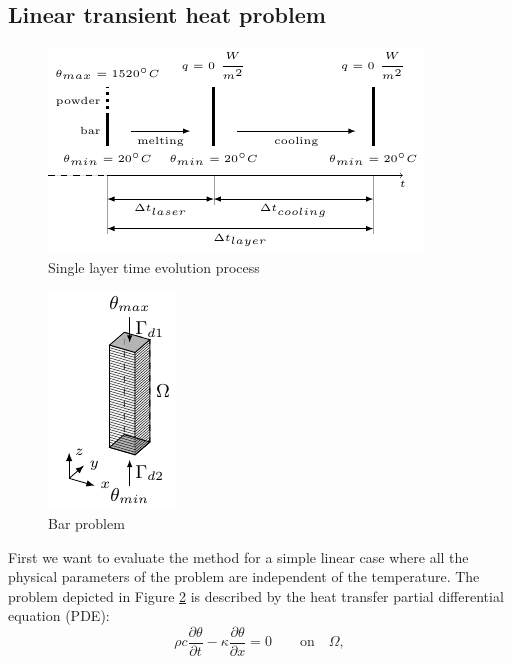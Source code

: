 \documentclass[3p]{article}
\begin{document}
\subsection*{Linear transient heat problem}
\begin{figure}[!h]
\centering
  \includegraphics[width=0.8\linewidth]{Pictures/OneDimensionalPhysicalModelProcess.pdf}
  \caption{Single layer time evolution process}
  \label{fig:1DProcessLayer}
  
\end{figure}
\begin{figure}[!h]
\centering
  \includegraphics[width=0.4\linewidth]{Pictures/AMBar1DInProgress_mod.pdf}
  \caption{Bar problem}
  \label{fig:1DProblem}
  
\end{figure}
First we want to evaluate the method for a simple linear case where all the physical parameters of the problem are independent of the temperature.
The problem depicted in Figure \ref{fig:1DProblem} is described by the heat transfer partial differential equation (PDE):
\begin{equation}
\rho c \dfrac{\partial\theta}{\partial t} - \kappa\dfrac{\partial\theta}{\partial x} = 0 \qquad \text{on} \quad \Omega,
\end{equation}
\end{document}
